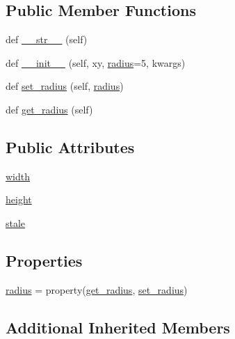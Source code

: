 \subsection*{Public Member Functions}
\begin{DoxyCompactItemize}
\item 
def \hyperlink{classmatplotlib_1_1patches_1_1Circle_a6d4b65d0fc75ad18b08fb0121f0e68aa}{\+\_\+\+\_\+str\+\_\+\+\_\+} (self)
\item 
def \hyperlink{classmatplotlib_1_1patches_1_1Circle_a892bbc52f82ccf41d33802c3d3ba227f}{\+\_\+\+\_\+init\+\_\+\+\_\+} (self, xy, \hyperlink{classmatplotlib_1_1patches_1_1Circle_a3418e00810432a9780d3794451b7f2d0}{radius}=5, kwargs)
\item 
def \hyperlink{classmatplotlib_1_1patches_1_1Circle_acbc80dd84cc7972c98628006d529dd25}{set\+\_\+radius} (self, \hyperlink{classmatplotlib_1_1patches_1_1Circle_a3418e00810432a9780d3794451b7f2d0}{radius})
\item 
def \hyperlink{classmatplotlib_1_1patches_1_1Circle_aed6967429d1fda4963d28eb9a1360e5b}{get\+\_\+radius} (self)
\end{DoxyCompactItemize}
\subsection*{Public Attributes}
\begin{DoxyCompactItemize}
\item 
\hyperlink{classmatplotlib_1_1patches_1_1Circle_a06111c58ce8cd60dc95023d42dc995dc}{width}
\item 
\hyperlink{classmatplotlib_1_1patches_1_1Circle_ab796d48e6c55941f825f85f32b9b4472}{height}
\item 
\hyperlink{classmatplotlib_1_1patches_1_1Circle_acd023af37224735fb4fc039059951bc9}{stale}
\end{DoxyCompactItemize}
\subsection*{Properties}
\begin{DoxyCompactItemize}
\item 
\hyperlink{classmatplotlib_1_1patches_1_1Circle_a3418e00810432a9780d3794451b7f2d0}{radius} = property(\hyperlink{classmatplotlib_1_1patches_1_1Circle_aed6967429d1fda4963d28eb9a1360e5b}{get\+\_\+radius}, \hyperlink{classmatplotlib_1_1patches_1_1Circle_acbc80dd84cc7972c98628006d529dd25}{set\+\_\+radius})
\end{DoxyCompactItemize}
\subsection*{Additional Inherited Members}


